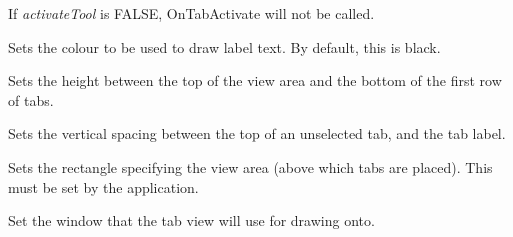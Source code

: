 If {\it activateTool} is FALSE, OnTabActivate will not be called.



Sets the colour to be used to draw label text. By default, this is
black.



Sets the height between the top of the view area and the bottom of the first
row of tabs.



Sets the vertical spacing between the top of an unselected tab, and the tab label.

\label{wxtabviewsetviewrect}


Sets the rectangle specifying the view area (above which tabs are
placed). This must be set by the application. 



Set the window that the tab view will use for drawing onto.

